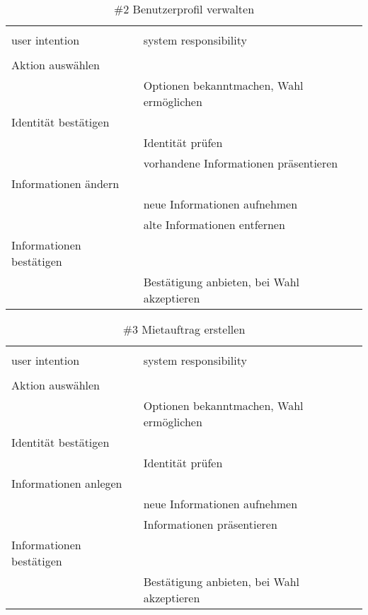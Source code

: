 \begin{table}[H]
\caption{\#2 Benutzerprofil verwalten }
\centering
\begin{tabular}{l l}
\\ [-0.5ex]

\hline\hline
\\ [-0.5ex]
user intention & system responsibility
\\ [1.5ex]
\hline
\\ [-0.5ex]
Aktion auswählen 			& 											 \\[1ex]
							& Optionen bekanntmachen, Wahl ermöglichen	 \\[1ex]
Identität bestätigen		& 											 \\[1ex]
							& Identität prüfen							 \\[1ex]
							& vorhandene Informationen präsentieren      \\[1ex] 
Informationen ändern 		& 											 \\[1ex] 
							& neue Informationen aufnehmen				 \\[1ex]
							& alte Informationen entfernen				 \\[1ex]
Informationen bestätigen	& 											 \\[1ex]
							& Bestätigung anbieten, bei Wahl akzeptieren \\[1ex]
\hline
\end{tabular}
\label{tab:profilbearbeiten}
\end{table}

\begin{table}[H]
\caption{\#3 Mietauftrag erstellen }
\centering
\begin{tabular}{l l}
\\ [-0.5ex]

\hline\hline
\\ [-0.5ex]
user intention & system responsibility
\\ [1.5ex]
\hline
\\ [-0.5ex]
Aktion auswählen 			& 											 \\[1ex]
							& Optionen bekanntmachen, Wahl ermöglichen	 \\[1ex]
Identität bestätigen		& 											 \\[1ex]
							& Identität prüfen							 \\[1ex]
Informationen anlegen 		& 											 \\[1ex] 
							& neue Informationen aufnehmen				 \\[1ex]
							& Informationen präsentieren				 \\[1ex]
Informationen bestätigen	& 											 \\[1ex]
							& Bestätigung anbieten, bei Wahl akzeptieren \\[1ex]

\hline
\end{tabular}
\label{tab:mietauftrag}
\end{table}

